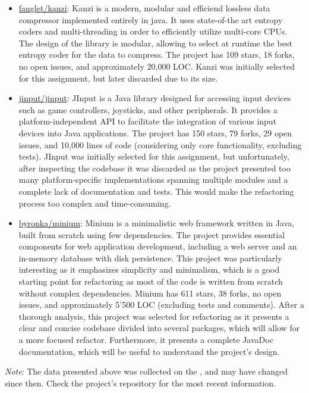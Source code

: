 \begin{itemize}
	\item \href{https://github.com/flanglet/kanzi}{fanglet/kanzi}: Kanzi is a modern, modular and efficiend lossless data compressor implemented entirely in java. It uses state-of-the art entropy coders and multi-threading in order to efficiently utilize multi-core CPUs. The design of the library is modular, allowing to select at runtime the best entropy coder for the data to compress. The project has 109 stars, 18 forks, no open issues, and approximately 20,000 LOC. Kanzi was initially selected for this assignment, but later discarded due to its size.
	\item \href{https://github.com/jinput/jinput}{jinput/jinput}: JInput is a Java library designed for accessing input devices such as game controllers, joysticks, and other peripherals. It provides a platform-independent API to facilitate the integration of various input devices into Java applications. The project has 150 stars, 79 forks, 29 open issues, and 10,000 lines of code (considering only core functionality, excluding tests). JInput was initially selected for this assignment, but unfortunately, after inspecting the codebase it was discarded as the project presented too many platform-specific implementations spanning multiple modules and a complete lack of documentation and tests. This would make the refactoring process too complex and time-consuming.
	\item \href{https://github.com/byronka/minum}{byronka/minium}: Minium is a minimalistic web framework written in Java, built from scratch using few dependencies. The project provides essential components for web application development, including a web server and an in-memory database with disk persistence. This project was particularly interesting as it emphasizes simplicity and minimalism, which is a good starting point for refactoring as most of the code is written from scratch without complex dependencies. Minium has 611 stars, 38 forks, no open issues, and approximately 5'500 LOC (excluding tests and comments). After a thorough analysis, this project was selected for refactoring as it presents a clear and concise codebase divided into several packages, which will allow for a more focused refactor. Furthermore, it presents a complete JavaDoc documentation, which will be useful to understand the project's design.
\end{itemize}

\noindent \textit{Note}: The data presented above was collected on the , and may have changed since then. Check the project's repository for the most recent information.


